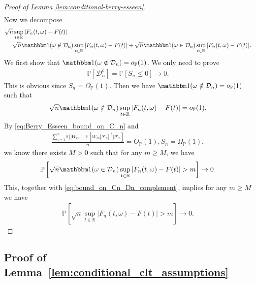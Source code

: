 \documentclass[12pt]{article}
\theoremstyle{definition}
\def\P{\mathbb{P}}
\def\P{\mathbb{P}}
\newcommand{\E}{\mathbb E}								%
\renewcommand{\P}{\mathbb{P}}							%
\newcommand{\indicator}{\mathbbm 1}						%
\begin{document}
\begin{proof}[Proof of Lemma \ref{lem:conditional-berry-esseen}]
\begin{align}
		\end{align}
		Now we decompose 
		\begin{align*}
			&
			\sqrt{n}\sup_{t\in\mathbb{R}}|F_n(t,\omega)-F(t)|\\
			&
			=\sqrt{n}\indicator(\omega\notin \mathcal{D}_n)\sup_{t\in\mathbb{R}}|F_n(t,\omega)-F(t)|+\sqrt{n}\indicator(\omega\in\mathcal{D}_n)\sup_{t\in\mathbb{R}}|F_n(t,\omega)-F(t)|.
		\end{align*}
		We first show that $\indicator(\omega\notin\mathcal{D}_n)=o_{\P}(1)$. We only need to prove 
		\begin{align*}
			\P[\mathcal{D}_n^{c}]=\P[S_n\leq 0]\rightarrow0.
		\end{align*}
		This is obvious since $S_n=\Omega_{\P}(1)$. Then we have $\indicator(\omega\notin\mathcal{D}_n)=o_{\P}(1)$ such that 
		\begin{align}\label{eq:bound_on_Cn_Dn_complement}
			\sqrt{n}\indicator(\omega\notin\mathcal{D}_n)\sup_{t\in\mathbb{R}}|F_n(t,\omega)-F(t)|=o_{\P}(1).
		\end{align}
		By \eqref{eq:Berry_Esseen_bound_on_C_n} and 
		\begin{align*}
			\frac{\sum_{i=1}^n \E[|W_{in}-\E[W_{in}|\mathcal{F}_n]|^3|\mathcal{F}_n]}{n}=O_{\P}(1), S_n=\Omega_{\P}(1),
		\end{align*}
		we know there exists $M>0$ such that for any $m\geq M$, we have 
		\begin{align*}
			\P\left[\sqrt{n}\indicator(\omega\in\mathcal{D}_n)\sup_{t\in\mathbb{R}}|F_n(t,\omega)-F(t)|> m\right]\rightarrow0.
		\end{align*}
		This, together with \eqref{eq:bound_on_Cn_Dn_complement}, implies for any $m\geq M$ we have 
		\begin{align*}
			\P\left[\sqrt{n}\sup_{t\in\mathbb{R}}|F_n(t,\omega)-F(t)|> m\right]\rightarrow0.
		\end{align*}
	  \end{proof}



	



\subsection{Proof of Lemma~\ref{lem:conditional_clt_assumptions}}
\end{document}

